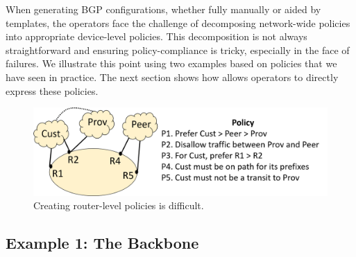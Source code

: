 %

When generating BGP configurations, whether fully manually or aided by templates, the operators face the challenge of decomposing network-wide policies
into appropriate device-level policies.
This decomposition is not always straightforward and ensuring policy-compliance is tricky, especially in the face of failures. We illustrate this point using two examples based on policies that we have seen in practice. The next section shows how \sysname allows operators to directly express these policies. 

\begin{figure}[t!]
\centering
\includegraphics[width=\columnwidth]{figures/example1}
\caption{Creating router-level policies is difficult.}
\label{fig:example1}
\end{figure}

\subsection{Example 1:  The Backbone}

